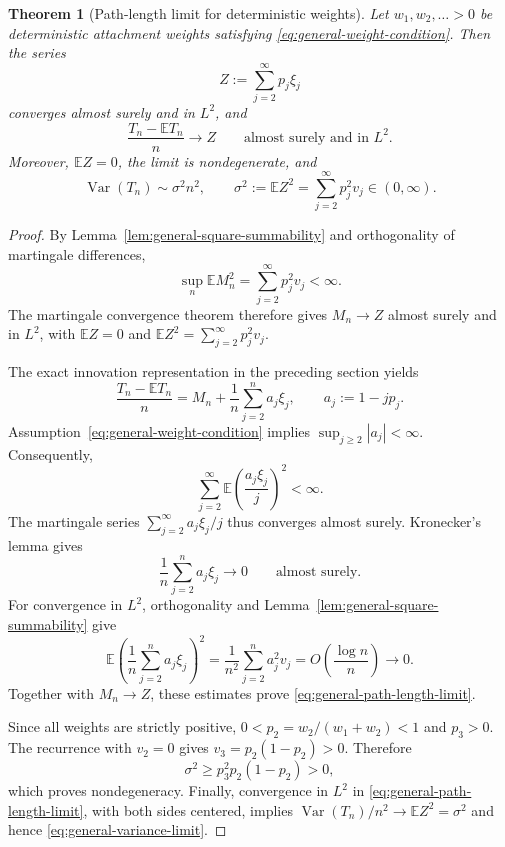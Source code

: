 \documentclass[11pt,a4paper]{article}
\newtheorem{theorem}{Theorem}[section]
\newcommand{\E}{\mathbb{E}}
\newcommand{\1}{\mathbf{1}}
\begin{document}
\begin{theorem}[Path-length limit for deterministic weights]
\label{thm:general-path-length-limit}
Let $w_1,w_2,\ldots>0$ be deterministic attachment weights satisfying
\eqref{eq:general-weight-condition}.  Then the series
\begin{equation}
  Z:=\sum_{j=2}^{\infty}p_j\xi_j
  \label{eq:general-limit-series}
\end{equation}
converges almost surely and in $L^2$, and
\begin{equation}
  \frac{T_n-\E T_n}{n}\longrightarrow Z
  \qquad\text{almost surely and in }L^2.
  \label{eq:general-path-length-limit}
\end{equation}
Moreover, $\E Z=0$, the limit is nondegenerate, and
\begin{equation}
  \operatorname{Var}(T_n)\sim\sigma^2n^2,
  \qquad
  \sigma^2:=\E Z^2
    =\sum_{j=2}^{\infty}p_j^2v_j\in(0,\infty).
  \label{eq:general-variance-limit}
\end{equation}
\end{theorem}

\begin{proof}
By Lemma~\ref{lem:general-square-summability} and orthogonality of
martingale differences,
\[
  \sup_n\E M_n^2
  =\sum_{j=2}^{\infty}p_j^2v_j<\infty.
\]
The martingale convergence theorem therefore gives $M_n\to Z$ almost
surely and in $L^2$, with $\E Z=0$ and
$\E Z^2=\sum_{j=2}^{\infty}p_j^2v_j$.

The exact innovation representation in the preceding section yields
\begin{equation}
  \frac{T_n-\E T_n}{n}
  =M_n+\frac1n\sum_{j=2}^n a_j\xi_j,
  \qquad a_j:=1-jp_j.
  \label{eq:general-limit-remainder}
\end{equation}
Assumption~\eqref{eq:general-weight-condition} implies
$\sup_{j\ge2}|a_j|<\infty$.  Consequently,
\[
  \sum_{j=2}^{\infty}
    \E\left(\frac{a_j\xi_j}{j}\right)^2<\infty.
\]
The martingale series $\sum_{j=2}^{\infty}a_j\xi_j/j$ thus converges
almost surely.  Kronecker's lemma gives
\[
  \frac1n\sum_{j=2}^n a_j\xi_j\longrightarrow0
  \qquad\text{almost surely}.
\]
For convergence in $L^2$, orthogonality and
Lemma~\ref{lem:general-square-summability} give
\[
  \E\left(\frac1n\sum_{j=2}^n a_j\xi_j\right)^2
  =\frac1{n^2}\sum_{j=2}^n a_j^2v_j
  =O\left(\frac{\log n}{n}\right)\longrightarrow0.
\]
Together with $M_n\to Z$, these estimates prove
\eqref{eq:general-path-length-limit}.

Since all weights are strictly positive,
$0<p_2=w_2/(w_1+w_2)<1$ and $p_3>0$.  The recurrence with $v_2=0$
gives $v_3=p_2(1-p_2)>0$.  Therefore
\[
  \sigma^2\ge p_3^2p_2(1-p_2)>0,
\]
which proves nondegeneracy.  Finally, convergence in $L^2$ in
\eqref{eq:general-path-length-limit}, with both sides centered, implies
$\operatorname{Var}(T_n)/n^2\to\E Z^2=\sigma^2$ and hence
\eqref{eq:general-variance-limit}.
\end{proof}
\end{document}

